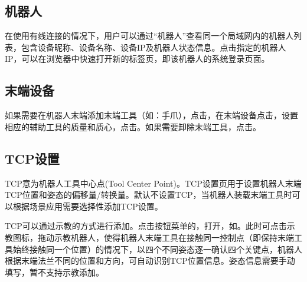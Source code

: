 \subsection{机器人}
在使用有线连接的情况下，用户可以通过“机器人”查看同一个局域网内的机器人列表，包含设备昵称、设备名称、设备IP及机器人状态信息。点击指定的机器人IP，可以在浏览器中快速打开新的标签页，即该机器人的系统登录页面。

\subsection{末端设备}
\label{sec:末端设备}
如果需要在机器人末端添加末端工具（如：手爪），点击，在末端设备点击，设置相应的辅助工具的质量和质心，点击。如果需要卸除末端工具，点击。


\subsection{TCP设置}
\label{sec:TCP设置}
TCP意为机器人工具中心点(Tool Center Point)。TCP设置页用于设置机器人末端TCP位置和姿态的偏移量/转换量。默认不设置TCP，当机器人装载末端工具时可以根据场景应用需要选择性添加TCP设置。

TCP可以通过示教的方式进行添加。点击按钮菜单的，打开，如。此时可点击示教图标，拖动示教机器人，使得机器人末端工具在接触同一控制点（即保持末端工具始终接触同一个位置）的情况下，以四个不同姿态逐一确认四个关键点，机器人根据末端法兰不同的位置和方向，可自动识别TCP位置信息。姿态信息需要手动填写，暂不支持示教添加。

